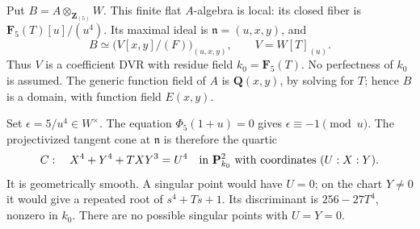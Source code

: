 \documentclass[11pt,a4paper]{article}
\theoremstyle{remark}
\newcommand{\Z}{\mathbf Z}
\newcommand{\Q}{\mathbf Q}
\newcommand{\F}{\mathbf F}
\begin{document}
Put $B=A\otimes_{\Z_{(5)}}W$. This finite flat $A$-algebra is local:
its closed fiber is $\F_5(T)[u]/(u^4)$. Its maximal ideal is
$\mathfrak n=(u,x,y)$, and
\[
 B\simeq\bigl(V[x,y]/(F)\bigr)_{(u,x,y)},
 \qquad V=W[T]_{(u)}.
\]
Thus $V$ is a coefficient DVR with residue field $k_0=\F_5(T)$.
No perfectness of $k_0$ is assumed. The generic function field of $A$
is $\Q(x,y)$, by solving for $T$; hence $B$ is a domain, with function
field $E(x,y)$.

Set $\epsilon=5/u^4\in W^\times$. The equation
$\Phi_5(1+u)=0$ gives $\epsilon\equiv-1\pmod u$.
The projectivized tangent cone at $\mathfrak n$ is therefore the quartic
\begin{equation}\label{eq:twodimtangent}
C:\quad X^4+Y^4+TXY^3=U^4
       \quad\hbox{in }\mathbf P^2_{k_0}
       \text{ with coordinates }(U:X:Y).
\end{equation}
It is geometrically smooth. A singular point would have $U=0$;
on the chart $Y\ne0$ it would give a repeated root of
$s^4+Ts+1$. Its discriminant is $256-27T^4$, nonzero in $k_0$.
There are no possible singular points with $U=Y=0$.
\end{document}
